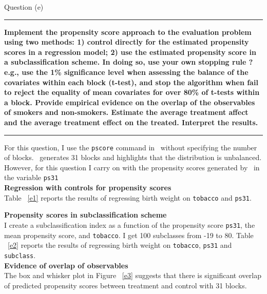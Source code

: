 \documentclass[12pt]{article}
\newcommand\question[1]{\vspace{1em}\hrule\vspace{1em}\textbf{#1}\vspace{1em}\hrule\vspace{1em}}
\begin{document}
\newpage
\begin{center}\LARGE{Question (e)}\end{center}
\question{Implement the propensity score approach to the evaluation problem using two methods: 1) control directly for the estimated propensity scores in a regression model; 2) use the estimated propensity score in a subclassification scheme.  In doing so, use your own stopping rule ? e.g., use the 1\% significance level when assessing the balance of the covariates within each block (t-test), and stop the algorithm when fail to reject the equality of mean covariates for over 80\% of t-tests within a block.  Provide empirical evidence on the overlap of the observables of smokers and non-smokers.  Estimate the average treatment affect and the average treatment effect on the treated.  Interpret the results.  
}

For this question, I use the \verb|pscore| command in \stata \ without specifying the number of blocks. \stata \ generates 31 blocks and highlights that the distribution is unbalanced. However, for this question I carry on with the propensity scores generated by \stata \ in the variable \verb|ps31|\\

\textbf{Regression with controls for propensity scores}\\

Table ~\ref{e1} reports the results of regressing birth weight on \verb|tobacco| and \verb|ps31|.

\textbf{Propensity scores in subclassification scheme}\\

I create a subclassification index as a function of the propensity score \verb|ps31|, the mean propensity score, and \verb|tobacco|. I get 100 subclasses from -19 to 80. Table ~\ref{e2} reports the results of regressing birth weight on \verb|tobacco|, \verb|ps31| and \verb|subclass|.\\

\textbf{Evidence of overlap of observables}\\
The box and whisker plot in Figure ~\ref{e3} suggests that there is significant overlap of predicted propensity scores between treatment and control with 31 blocks.
 
\end{document}
